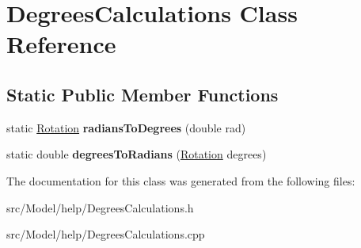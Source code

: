 \hypertarget{classDegreesCalculations}{}\section{Degrees\+Calculations Class Reference}
\label{classDegreesCalculations}
\subsection*{Static Public Member Functions}
\begin{DoxyCompactItemize}
\item 
static \hyperlink{classRotation}{Rotation} {\bfseries radians\+To\+Degrees} (double rad)\hypertarget{classDegreesCalculations_a94ae980258188bfe2d234038764c016f}{}\label{classDegreesCalculations_a94ae980258188bfe2d234038764c016f}

\item 
static double {\bfseries degrees\+To\+Radians} (\hyperlink{classRotation}{Rotation} degrees)\hypertarget{classDegreesCalculations_ace75036176cddf90162bafc2746d6611}{}\label{classDegreesCalculations_ace75036176cddf90162bafc2746d6611}

\end{DoxyCompactItemize}


The documentation for this class was generated from the following files\+:\begin{DoxyCompactItemize}
\item 
src/\+Model/help/Degrees\+Calculations.\+h\item 
src/\+Model/help/Degrees\+Calculations.\+cpp\end{DoxyCompactItemize}
